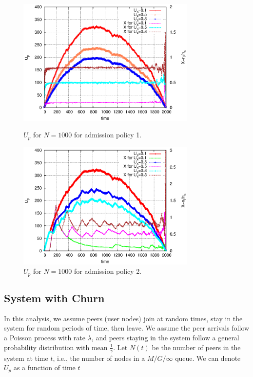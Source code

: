 \documentclass[paper]{ieice}
\begin{document}
\begin{figure}[thb]
\begin{minipage}[b]{0.4\linewidth}
\centering
\includegraphics[width=3.5in]{graphs/U_p_n_1000.eps}
\caption{$U_p$ for $N=1000$ for admission policy 1.}
\label{fig:U_p_1000_1}
\end{minipage}
\hspace{0.5cm}
\begin{minipage}[b]{0.68\linewidth}
\centering
\includegraphics[width=3.5in]{graphs/U_p_n_1000_admi.eps}
\caption{$U_p$ for $N=1000$ for admission policy 2.}
\label{fig:U_p_1000_2}
\end{minipage}
\end{figure}

\subsection{System with Churn}\label{sec:stablesystemwithchurn}

In this analysis, we assume peers (user nodes) join at random times, stay in the system for random periods of time, then leave. 
We assume the peer arrivals follow a Poisson process with rate $\lambda$, and peers staying in the system follow a general probability distribution with mean $\frac{1}{\gamma}$.
Let $N(t)$ be the number of peers in the system at time $t$, i.e., the number of nodes in a $M/G/\infty$ queue.  We can denote $U_p$ as a function of time $t$
\end{document}
